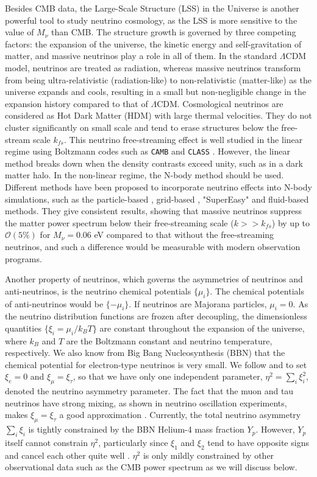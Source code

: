 Besides CMB data, the Large-Scale Structure (LSS) in the Universe is another powerful tool to study neutrino cosmology, as the LSS is more sensitive to the value of $M_\nu$ than CMB.
The structure growth is governed by three competing factors: the expansion of the universe, the kinetic energy and self-gravitation of matter, and massive neutrinos play a role in all of them. 
In the standard $\Lambda$CDM model, neutrinos are treated as radiation, whereas massive neutrinos transform from being ultra-relativistic (radiation-like) to non-relativistic (matter-like) as the universe expands and cools, resulting in a small but non-negligible change in the expansion history compared to that of $\Lambda$CDM. 
Cosmological neutrinos are considered as Hot Dark Matter (HDM) with large thermal velocities. They do not cluster significantly on small scale and tend to erase structures below the free-stream scale $k_{fs}$. This neutrino free-streaming effect is well studied in the linear regime using Boltzmann codes such as \texttt{CAMB} \cite{camb} and \texttt{CLASS} \cite {class}. 
However, the linear method breaks down when the density contrasts exceed unity, such as in a dark matter halo. In the non-linear regime, the N-body method should be used. Different methods have been proposed to incorporate neutrino effects into N-body simulations, such as the particle-based \cite{part}, grid-based \cite{grid, grid2, Carton}, "SuperEasy" \cite{Yvvone} and fluid-based \cite{Yvvone fluid, nuconcept} methods. 
They give consistent results, showing that massive neutrinos suppress the matter power spectrum below their free-streaming scale ($k>>k_{fs}$) by up to $\mathcal{O}(5\%)$ for $M_\nu = 0.06$ eV compared to that without the free-streaming neutrinos, and such a difference would be measurable with modern observation programs.


Another property of neutrinos, which governs the asymmetries of neutrinos and anti-neutrinos, is the neutrino chemical potentials $\{\mu_i\}$. The chemical potentials of anti-neutrinos would be $\{-\mu_i\}$. If neutrinos are Majorana particles, $\mu_i=0$.
As the neutrino distribution functions are frozen after decoupling, the dimensionless quantities $\{\xi_i=\mu_i/k_BT\}$ are constant throughout the expansion of the universe, where $k_B$ and $T$ are the Boltzmann constant and neutrino temperature, respectively.
We also know from Big Bang Nucleosynthesis (BBN) that the chemical potential for electron-type neutrinos is very small.
We follow \cite{Carton} and \cite{mu} to set $\xi_e=0$ and $\xi_\mu=\xi_\tau$, so that we have only one independent parameter, $\eta^2 = \sum_i \xi_i^2$, denoted the neutrino asymmetry parameter. 
The fact that the muon and tau neutrinos have strong mixing, as shown in neutrino oscillation experiments, makes $\xi_\mu=\xi_\tau$ a good approximation \cite{bbn1, bbn2}. Currently, the total neutrino asymmetry $\sum_i \xi_i$ is tightly constrained by the BBN Helium-4 mass fraction $Y_p$. However, $Y_p$ itself cannot constrain $\eta^2$, particularly since $\xi_1$ and $\xi_2$ tend to have opposite signs and cancel each other quite well \cite{eta_effect}. $\eta^2$ is only mildly constrained by other observational data such as the CMB power spectrum as we will discuss below.

